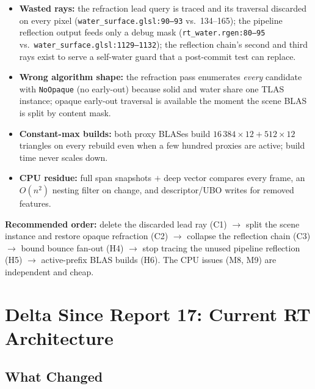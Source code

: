 \documentclass[11pt,a4paper]{article}
\begin{document}
\begin{itemize}
    \item \textbf{Wasted rays:} the refraction lead query is traced and its traversal discarded on every pixel (\texttt{water\_surface.glsl:90--93} vs.\ 134--165); the pipeline reflection output feeds only a debug mask (\texttt{rt\_water.rgen:80--95} vs.\ \texttt{water\_surface.glsl:1129--1132}); the reflection chain's second and third rays exist to serve a self-water guard that a post-commit test can replace.
    \item \textbf{Wrong algorithm shape:} the refraction pass enumerates \emph{every} candidate with \texttt{NoOpaque} (no early-out) because solid and water share one TLAS instance; opaque early-out traversal is available the moment the scene BLAS is split by content mask.
    \item \textbf{Constant-max builds:} both proxy BLASes build $16\,384\times12 + 512\times12$ triangles on every rebuild even when a few hundred proxies are active; build time never scales down.
    \item \textbf{CPU residue:} full span snapshots $+$ deep vector compares every frame, an $O(n^2)$ nesting filter on change, and descriptor/UBO writes for removed features.
\end{itemize}

\textbf{Recommended order:} delete the discarded lead ray (C1) $\rightarrow$ split the scene instance and restore opaque refraction (C2) $\rightarrow$ collapse the reflection chain (C3) $\rightarrow$ bound bounce fan-out (H4) $\rightarrow$ stop tracing the unused pipeline reflection (H5) $\rightarrow$ active-prefix BLAS builds (H6). The CPU issues (M8, M9) are independent and cheap.

\section{Delta Since Report 17: Current RT Architecture}

\subsection{What Changed}
\end{document}

